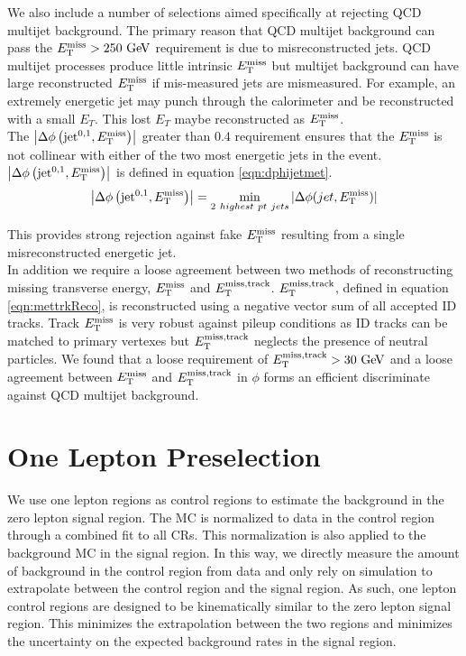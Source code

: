 
\indent We also include a number of selections aimed specifically at rejecting QCD multijet background.  The primary reason that QCD multijet background can pass the $\met > 250 \gev$ requirement is due to misreconstructed jets.  QCD multijet processes produce little intrinsic $E_{\mathrm{T}}^{\mathrm{miss}}$ but multijet background can have large reconstructed $E_{\mathrm{T}}^{\mathrm{miss}}$ if mis-measured jets are mismeasured.  For example, an extremely energetic jet may punch through the calorimeter and be reconstructed with a small $E_T$.  This lost $E_T$ maybe reconstructed as $E_{\mathrm{T}}^{\mathrm{miss}}$.  \\

\indent The $\left|\Delta\phi\left(\mathrm{jet}^{0,1},E_{\mathrm{T}}^{\mathrm{miss}}\right)\right|$ greater than $0.4$ requirement ensures that the $E_{\mathrm{T}}^{\mathrm{miss}}$ is not collinear with either of the two most energetic jets in the event.  $\left|\Delta\phi\left(\mathrm{jet}^{0,1},E_{\mathrm{T}}^{\mathrm{miss}}\right)\right|$ is defined in equation \ref{eqn:dphijetmet}. \\

\begin{equation}
\left|\Delta\phi\left(\mathrm{jet}^{0,1},E_{\mathrm{T}}^{\mathrm{miss}}\right)\right| = \min_{2~highest~pt~jets} |\Delta \phi ( jet, E_{\mathrm{T}}^{\mathrm{miss}} ) |
\label{eqn:dphijetmet}
\end{equation}

\indent This provides strong rejection against fake $E_{\mathrm{T}}^{\mathrm{miss}}$ resulting from a single misreconstructed energetic jet.  \\

\indent In addition we require a loose agreement between two methods of reconstructing missing transverse energy, $E_{\mathrm{T}}^{\mathrm{miss}}$ and $E_{\mathrm{T}}^{\mathrm{miss, track}}$.  $E_{\mathrm{T}}^{\mathrm{miss, track}}$, defined in equation \ref{eqn:mettrkReco}, is reconstructed using a negative vector sum of all accepted ID tracks.  Track $E_{\mathrm{T}}^{\mathrm{miss}}$ is very robust against pileup conditions as ID tracks can be matched to primary vertexes but $E_{\mathrm{T}}^{\mathrm{miss, track}}$ neglects the presence of neutral particles.  We found that a loose requirement of $\mettrk > 30 \gev$ and a loose agreement between $E_{\mathrm{T}}^{\mathrm{miss}}$ and $E_{\mathrm{T}}^{\mathrm{miss, track}}$ in $\phi$ forms an efficient discriminate against QCD multijet background. \\

\section{One Lepton Preselection}

\indent We use one lepton regions as control regions to estimate the background in the zero lepton signal region.  The MC is normalized to data in the control region through a combined fit to all CRs. This normalization is also applied to the background MC in the signal region.  In this way, we directly measure the amount of background in the control region from data and only rely on simulation to extrapolate between the control region and the signal region.  As such, one lepton control regions are designed to be kinematically similar to the zero lepton signal region.  This minimizes the extrapolation between the two regions and minimizes the uncertainty on the expected background rates in the signal region. \\

